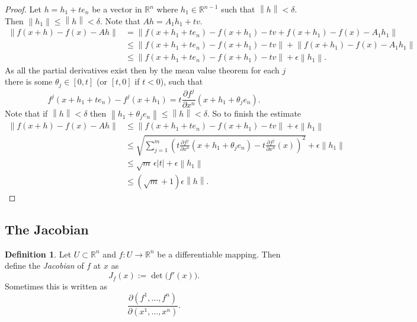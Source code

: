 \documentclass[12pt]{book}
\newcommand{\abs}[1]{\left\lvert {#1} \right\rvert}
\newcommand{\norm}[1]{\left\lVert {#1} \right\rVert}
\newcommand{\R}{{\mathbb{R}}}
\newcommand{\myindex}[1]{#1\index{#1}}
\theoremstyle{plain}
\theoremstyle{remark}
\theoremstyle{definition}
\newtheorem{defn}[thm]{Definition}
\theoremstyle{exercise}
\theoremstyle{example}
\begin{document}
\begin{proof}
Let $h = h_1 + t e_n$ be a vector in $\R^n$ where $h_1 \in \R^{n-1}$ such that
$\norm{h} < \delta$.  Then $\norm{h_1} \leq \norm{h} < \delta$.
Note that $Ah = A_1h_1 + tv$.
\begin{equation*}
\begin{split}
\norm{f(x+h) - f(x) - Ah}
& = \norm{f(x+h_1 + t e_n) - f(x+h_1) - tv + f(x+h_1) - f(x) - A_1h_1}
\\
& \leq \norm{f(x+h_1 + t e_n) - f(x+h_1) -tv} + \norm{f(x+h_1) - f(x) -
A_1h_1}
\\
& \leq \norm{f(x+h_1 + t e_n) - f(x+h_1) -tv} + \epsilon \norm{h_1} .
\end{split}
\end{equation*}
As all the partial derivatives exist then by the mean value theorem
for each $j$ there is some $\theta_j \in [0,t]$ (or $[t,0]$ if $t < 0$), such that
\begin{equation*}
f^j(x+h_1 + t e_n) - f^j(x+h_1) =
t \frac{\partial f^j}{\partial x^n}(x+h_1+\theta_j e_n).
\end{equation*}
Note that if $\norm{h} < \delta$ then $\norm{h_1+\theta_j e_n} \leq \norm{h}
< \delta$.
So to finish the estimate
\begin{equation*}
\begin{split}
\norm{f(x+h) - f(x) - Ah}
& \leq \norm{f(x+h_1 + t e_n) - f(x+h_1) -tv} + \epsilon \norm{h_1}
\\
& \leq \sqrt{\sum_{j=1}^m {\left(t\frac{\partial f^j}{\partial
x^n}(x+h_1+\theta_j e_n) -
t \frac{\partial f^j}{\partial x^n}(x)\right)}^2} + \epsilon \norm{h_1}
\\
& \leq \sqrt{m}\, \epsilon \abs{t} + \epsilon \norm{h_1}
\\
& \leq (\sqrt{m}+1)\epsilon \norm{h} .
\end{split}
\end{equation*}
\end{proof}

\subsection{The Jacobian}

\begin{defn}
Let $U \subset \R^n$ and
$f \colon U \to \R^n$ be a differentiable mapping.  Then define the
\emph{\myindex{Jacobian}} of $f$ at $x$ as
\begin{equation*}
J_f(x) := \det\bigl( f'(x) \bigr) .
\end{equation*}
Sometimes this is written as
\begin{equation*}
\frac{\partial(f^1,\ldots,f^n)}{\partial(x^1,\ldots,x^n)} .
\end{equation*}
\end{defn}
\end{document}
